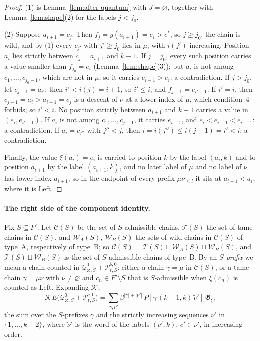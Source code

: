 \documentclass[11pt]{article}
\newcommand{\G}{\mathfrak{G}}
\begin{document}
\begin{proof}
(1) is Lemma~\ref{lem:after-quantum} with $J=\varnothing$, together
with Lemma~\ref{lem:shape}(2) for the labels $j<j_0$.

(2) Suppose $a_{i+1}=c_j$. Then $f_j=y(a_{i+1})=e_i>c^\ast$, so
$j\geq j_0$, the chain is wild, and by (1) every $c_{j'}$ with
$j'\geq j_0$ lies in $\mu$, with $i(j')$ increasing. Position $a_i$
lies strictly between $c_j=a_{i+1}$ and $k-1$. If $j=j_0$, every such
position carries a value smaller than $f_{j_0}=e_i$
(Lemma~\ref{lem:shape}(3)); but $a_i$ is not among
$c_1,\ldots,c_{j_0-1}$, which are not in $\mu$, so it carries
$e_{i-1}>e_i$: a contradiction. If $j>j_0$, let $c_{j-1}=a_{i'}$; then
$i'<i(j)=i+1$, so $i'\leq i$, and $f_{j-1}=e_{i'-1}$. If $i'=i$, then
$c_{j-1}=a_i>a_{i+1}=c_j$ is a descent of $\nu$ at a lower index of
$\mu$, which condition~4 forbids; so $i'<i$. No position strictly
between $a_{i+1}$ and $k-1$ carries a value in $(e_i,e_{i'-1})$. If
$a_i$ is not among $c_1,\ldots,c_{j-1}$, it carries $e_{i-1}$, and
$e_i<e_{i-1}<e_{i'-1}$: a contradiction. If $a_i=c_{j''}$ with
$j''<j$, then $i=i(j'')\leq i(j-1)=i'<i$: a contradiction.

Finally, the value $\xi(a_i)=e_i$ is carried to position $k$ by the
label $(a_i,k)$ and to position $a_{i+1}$ by the label $(a_{i+1},k)$,
and no later label of $\mu$ and no label of $\nu$ has lower index
$a_{i+1}$; so in the endpoint of every prefix $\mu\nu_{\leq l}$ it sits
at $a_{i+1}<a_i$, where it is Left.
\end{proof}

\paragraph{The right side of the component identity.}
Fix $S\subseteq F'$. Let $\mathcal C(S)$ be the set of $S$-admissible
chains, $\mathcal T(S)$ the set of tame chains in $\mathcal C(S)$, and
$\mathcal W_A(S)$, $\mathcal W_B(S)$ the sets of wild chains in
$\mathcal C(S)$ of type~A, respectively of type~B; so
$\mathcal C(S)=\mathcal T(S)\sqcup\mathcal W_A(S)\sqcup\mathcal W_B(S)$,
and $\mathcal T(S)\sqcup\mathcal W_B(S)$ is the set of $S$-admissible
chains of type~B. By an \emph{$S$-prefix} we mean a chain counted in
$\mathcal Q^0_{\varnothing,S}+\mathcal P^{\flat,0}_{t,S}$: either a
chain $\gamma=\mu$ in $\mathcal C(S)$, or a tame chain
$\gamma=\mu\nu$ with $\nu\neq\varnothing$ and $c_n\in F'\setminus S$
that is $S$-admissible when $\xi(c_n)$ is counted as Left. Expanding
$\mathcal K$,
\[
 \mathcal KE\bigl(\mathcal Q^0_{\varnothing,S}+\mathcal P^{\flat,0}_{t,S}\bigr)
 =\sum_{\gamma,\nu'}\beta^{|\gamma|+|\nu'|}\,P[\gamma\,(k-1,k)\,\tilde\nu']\,\G_\xi ,
\]
the sum over the $S$-prefixes $\gamma$ and the strictly increasing
sequences $\nu'$ in $\{1,\ldots,k-2\}$, where $\tilde\nu'$ is the word
of the labels $(c',k)$, $c'\in\nu'$, in increasing order.
\end{document}
